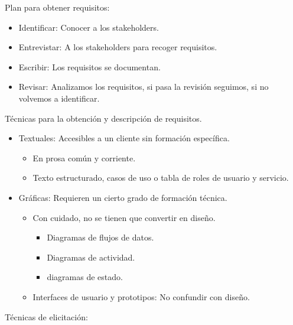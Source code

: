 \documentclass[12pt, twoside, openright]{report} %
\begin{document}
	Plan para obtener requisitos:
    \begin{itemize}
		\item
		Identificar: Conocer a los stakeholders.
		\item
		Entrevistar: A los stakeholders para recoger requisitos.
		\item
		Escribir: Los requisitos se documentan.
		\item
		Revisar: Analizamos los requisitos, si pasa la revisión seguimos,
		si no volvemos a identificar.
    \end{itemize}

	Técnicas para la obtención y descripción de requisitos.
    \begin{itemize}
		\item
		Textuales: Accesibles a un cliente sin formación específica.
		\begin{itemize}
			\item
				En prosa común y corriente.
			\item
				Texto estructurado, casos de uso o tabla de roles de usuario y
				servicio.
		\end{itemize}
		\item Gráficas: Requieren un cierto grado de formación técnica.
			\begin{itemize}
			\item Con cuidado, no se tienen que convertir en diseño.
					\begin{itemize}
						\item
						Diagramas de flujos de datos.
						\item
						Diagramas de actividad.
						\item
						diagramas de estado.
					\end{itemize}
			\item Interfaces de usuario y prototipos: No confundir con diseño.
			\end{itemize}
	\end{itemize}


	Técnicas de elicitación:
\end{document}
